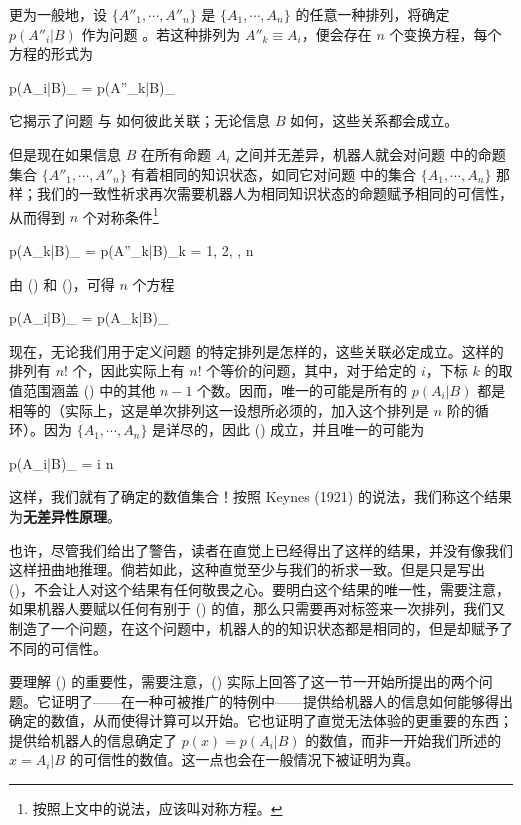 更为一般地，设 $\{A''_1,\cdots,A''_n\}$ 是 $\{A_1,\cdots,A_n\}$ 的任意一种排列，将确定 $p(A''_i|B)$ 作为问题 。若这种排列为 $A''_k\equiv A_i$，便会存在 $n$ 个变换方程，每个方程的形式为

\placeformula[2-92]
\startformula
p(A_i|B)_{} = p(A''_k|B)_{}
\stopformula

它揭示了问题  与  如何彼此关联；无论信息 $B$ 如何，这些关系都会成立。

但是现在如果信息 $B$ 在所有命题 $A_i$ 之间并无差异，机器人就会对问题  中的命题集合 $\{A''_1,\cdots,A''_n\}$ 有着相同的知识状态，如同它对问题  中的集合 $\{A_1,\cdots,A_n\}$ 那样；我们的一致性祈求再次需要机器人为相同知识状态的命题赋予相同的可信性，从而得到 $n$ 个对称条件\footnote{按照上文中的说法，应该叫对称方程。}

\placeformula[2-93]
\startformula
p(A_k|B)_{} = p(A''_k|B)_{}\quad\quad k = 1, 2, \cdots, n
\stopformula

由 (\in[2-92]) 和 (\in[2-93])，可得 $n$ 个方程

\placeformula[2-94]
\startformula
p(A_i|B)_{} = p(A_k|B)_{}
\stopformula

现在，无论我们用于定义问题  的特定排列是怎样的，这些关联必定成立。这样的排列有 $n!$ 个，因此实际上有 $n!$ 个等价的问题，其中，对于给定的 $i$，下标 $k$ 的取值范围涵盖 (\in[2-94]) 中的其他 $n - 1$ 个数。因而，唯一的可能是所有的 $p(A_i|B)$ 都是相等的（实际上，这是单次排列这一设想所必须的，加入这个排列是 $n$ 阶的循环）。因为 $\{A_1,\cdots,A_n\}$ 是详尽的，因此 (\in[2-86]) 成立，并且唯一的可能为

\placeformula[2-95]
\startformula
p(A_i|B)_{} = \quad{} \le i \le n
\stopformula

这样，我们就有了确定的数值集合！按照 Keynes (1921) 的说法，我们称这个结果为{\bf 无差异性原理}。

也许，尽管我们给出了警告，读者在直觉上已经得出了这样的结果，并没有像我们这样扭曲地推理。倘若如此，这种直觉至少与我们的祈求一致。但是只是写出 (\in[2-95])，不会让人对这个结果有任何敬畏之心。要明白这个结果的唯一性，需要注意，如果机器人要赋以任何有别于 (\in[2-95]) 的值，那么只需要再对标签来一次排列，我们又制造了一个问题，在这个问题中，机器人的的知识状态都是相同的，但是却赋予了不同的可信性。

要理解 (\in[2-95]) 的重要性，需要注意，(\in[2-95]) 实际上回答了这一节一开始所提出的两个问题。它证明了——在一种可被推广的特例中——提供给机器人的信息如何能够得出确定的数值，从而使得计算可以开始。它也证明了直觉无法体验的更重要的东西；提供给机器人的信息确定了 $p(x) = p(A_i|B)$ 的数值，而非一开始我们所述的 $x = A_i|B$ 的可信性的数值。这一点也会在一般情况下被证明为真。

